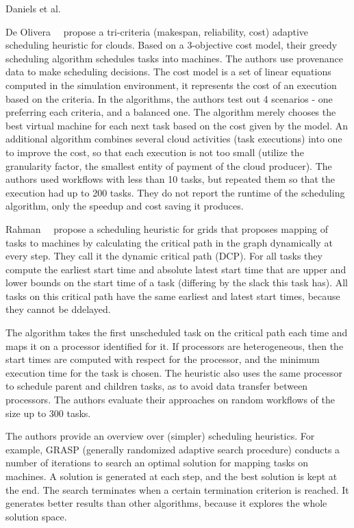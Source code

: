 \documentclass[sigconf,review,anonymous]{acmart}
\begin{document}
    Daniels et al.

    De Olivera~\etal~\cite{de2012provenance} propose a tri-criteria (makespan, reliability, cost) adaptive scheduling heuristic
    for clouds.
    Based on a 3-objective cost model, their greedy scheduling algorithm schedules tasks into machines.
    The authors use provenance data to make scheduling decisions.
    The cost model is a set of linear equations computed in the simulation environment, it represents the cost of an execution based on the criteria.
    In the algorithms, the authors test out 4 scenarios - one preferring each criteria, and a balanced one.
    The algorithm merely chooses the best virtual machine for each next task based on the cost given by the model.
    An additional algorithm combines several cloud activities (task executions) into one to improve the cost, so that each
    execution is not too small (utilize the granularity factor, the smallest entity of payment of the cloud producer).
    The authors used workflows with less than 10 tasks, but repeated them so that the execution had up to 200 tasks.
    They do not report the runtime of the scheduling algorithm, only the speedup and cost saving it produces.

    Rahman~\etal~\cite{rahman2013} propose a scheduling heuristic for grids that proposes mapping of tasks to machines by calculating
    the critical path in the graph dynamically at every step.
    They call it the dynamic critical path (DCP).
    For all tasks they compute the earliest start time and absolute latest start time that are upper and lower bounds
    on the start time of a task (differing by the slack this task has).
    All tasks on this critical path have the same earliest and latest start times, because they cannot be ddelayed.

    The algorithm takes the first unscheduled task on the critical path each time and maps it on a processor identified for it.
    If processors are heterogeneous, then the start times are computed with respect for the processor, and the minimum execution time for
    the task is chosen.
    The heuristic also uses the same processor to schedule parent and children tasks, as to avoid data transfer between processors.
    The authors evaluate their approaches on random workflows of the size up to 300 tasks.

    The authors provide an overview over (simpler) scheduling heuristics.
    For example, GRASP (generally randomized adaptive search procedure) conducts a number of iterations to search an optimal
    solution for mapping tasks on machines.
    A solution is generated at each step, and the best solution is kept at the end.
    The search terminates when a certain termination criterion is reached.
    It generates better results than other algorithms, because it explores the whole solution space.
\end{document}
